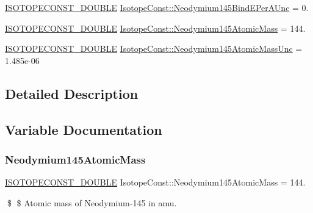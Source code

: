 \begin{DoxyCompactItemize}
\mbox{\hyperlink{group___isotope_const-_macros_ga8f45a7272ce02c0b4c65c44636ed719a}{I\+S\+O\+T\+O\+P\+E\+C\+O\+N\+S\+T\+\_\+\+D\+O\+U\+B\+LE}} \mbox{\hyperlink{group___isotope_const-_neodymium-_nd145_ga1d4386cf0c263b159938edb27c988731}{Isotope\+Const\+::\+Neodymium145\+Bind\+E\+Per\+A\+Unc}} = 0.
\item 
\mbox{\hyperlink{group___isotope_const-_macros_ga8f45a7272ce02c0b4c65c44636ed719a}{I\+S\+O\+T\+O\+P\+E\+C\+O\+N\+S\+T\+\_\+\+D\+O\+U\+B\+LE}} \mbox{\hyperlink{group___isotope_const-_neodymium-_nd145_ga9334cfc5c740dfba00b7436dfc8d2ffb}{Isotope\+Const\+::\+Neodymium145\+Atomic\+Mass}} = 144.
\item 
\mbox{\hyperlink{group___isotope_const-_macros_ga8f45a7272ce02c0b4c65c44636ed719a}{I\+S\+O\+T\+O\+P\+E\+C\+O\+N\+S\+T\+\_\+\+D\+O\+U\+B\+LE}} \mbox{\hyperlink{group___isotope_const-_neodymium-_nd145_ga129e215ea84fd9996aeb6a753ebe40fd}{Isotope\+Const\+::\+Neodymium145\+Atomic\+Mass\+Unc}} = 1.\+485e-\/06
\end{DoxyCompactItemize}


\subsection{Detailed Description}


\subsection{Variable Documentation}
\mbox{\label{group___isotope_const-_neodymium-_nd145_ga9334cfc5c740dfba00b7436dfc8d2ffb}} 
\subsubsection{\texorpdfstring{Neodymium145\+Atomic\+Mass}{Neodymium145AtomicMass}}
{\footnotesize\ttfamily \mbox{\hyperlink{group___isotope_const-_macros_ga8f45a7272ce02c0b4c65c44636ed719a}{I\+S\+O\+T\+O\+P\+E\+C\+O\+N\+S\+T\+\_\+\+D\+O\+U\+B\+LE}} Isotope\+Const\+::\+Neodymium145\+Atomic\+Mass = 144.}

\$ \$ Atomic mass of Neodymium-\/145 in amu. \mbox{\label{group___isotope_const-_neodymium-_nd145_ga129e215ea84fd9996aeb6a753ebe40fd}} 
